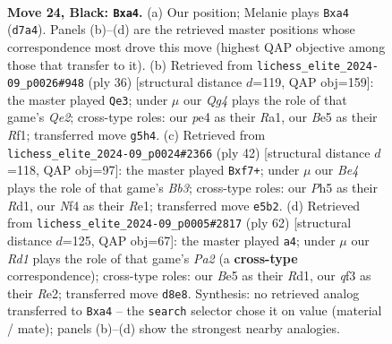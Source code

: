 \documentclass[11pt]{article}
\begin{document}
\clearpage

\begin{figure}[p]\centering
\begin{subfigure}{0.46\textwidth}\centering
\resizebox{\linewidth}{!}{%
\newchessgame
\chessboard[
  setfen={1r1r4/pppb1pk1/3P4/4b1qp/N3Pn2/5QPp/PP3P2/RBB1R1K1 b - - 0 24},
  showmover=false,
  pgfstyle=straightmove, color=movearrow, markmove={d7-a4}
]}
\caption{}
\end{subfigure}\hfill
\begin{subfigure}{0.46\textwidth}\centering
\resizebox{\linewidth}{!}{%
\newchessgame
\chessboard[
  setfen={r7/1pq1n1kp/p5p1/2Pp4/NP2prb1/3B1N2/P1P1Q1P1/R4RK1 w - - 0 19},
  showmover=false,
  pgfstyle=straightmove, color=movearrow, markmove={e2-e3}
]}
\caption{}
\end{subfigure}
\\[4pt]
\begin{subfigure}{0.46\textwidth}\centering
\resizebox{\linewidth}{!}{%
\newchessgame
\chessboard[
  setfen={r3r1k1/5ppp/pq1p4/4Nb2/Pp3B2/1Bb2Q2/5PPP/3RR1K1 w - - 0 22},
  showmover=false,
  pgfstyle=straightmove, color=movearrow, markmove={b3-f7}
]}
\caption{}
\end{subfigure}\hfill
\begin{subfigure}{0.46\textwidth}\centering
\resizebox{\linewidth}{!}{%
\newchessgame
\chessboard[
  setfen={2b2r1k/4r2p/p4pq1/1p3p2/3p1P2/3Bb2Q/PPP1R1NP/1K1R4 w - - 3 32},
  showmover=false,
  pgfstyle=straightmove, color=movearrow, markmove={a2-a4}
]}
\caption{}
\end{subfigure}
\caption{\textbf{Move 24, Black: \texttt{Bxa4}.} (a) Our position; Melanie plays \texttt{Bxa4} (\texttt{d7a4}). Panels (b)--(d) are the retrieved master positions whose correspondence most drove this move (highest QAP objective among those that transfer to it). (b) Retrieved from \texttt{lichess\_elite\_2024-09\_p0026\#948} (ply 36) [structural distance $d$=119, QAP obj=159]: the master played \texttt{Qe3}; under $\mu$ our \emph{Qg4} plays the role of that game's \emph{Qe2}; cross-type roles: our \emph{p}e4 as their \emph{R}a1, our \emph{B}e5 as their \emph{R}f1; transferred move \texttt{g5h4}. (c) Retrieved from \texttt{lichess\_elite\_2024-09\_p0024\#2366} (ply 42) [structural distance $d$=118, QAP obj=97]: the master played \texttt{Bxf7+}; under $\mu$ our \emph{Be4} plays the role of that game's \emph{Bb3}; cross-type roles: our \emph{P}h5 as their \emph{R}d1, our \emph{N}f4 as their \emph{R}e1; transferred move \texttt{e5b2}. (d) Retrieved from \texttt{lichess\_elite\_2024-09\_p0005\#2817} (ply 62) [structural distance $d$=125, QAP obj=67]: the master played \texttt{a4}; under $\mu$ our \emph{Rd1} plays the role of that game's \emph{Pa2} (a \textbf{cross-type} correspondence); cross-type roles: our \emph{B}e5 as their \emph{R}d1, our \emph{q}f3 as their \emph{R}e2; transferred move \texttt{d8e8}. Synthesis: no retrieved analog transferred to \texttt{Bxa4} -- the \texttt{search} selector chose it on value (material / mate); panels (b)--(d) show the strongest nearby analogies.}
\label{fig:thought-m47}
\end{figure}
\end{document}
